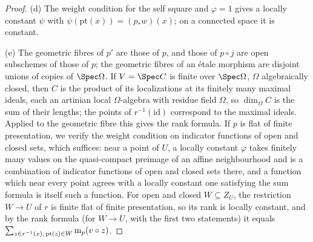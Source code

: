 \begin{proof}
(d) The weight condition for the self square and $\varphi=1$ gives a locally constant $\psi$ with
$\psi(\mathrm{pt}(x))=(p_\ast w)(x)$; on a connected space it is constant.

(e) The geometric fibres of $p'$ are those of $p$, and those of $p\circ j$ are open subschemes of those
of $p$; the geometric fibres of an \'etale morphism are disjoint unions of copies of $\Spec\Omega$. If
$V=\Spec C$ is finite over $\Spec\Omega$, $\Omega$ algebraically closed, then $C$ is the product of its
localizations at its finitely many maximal ideals, each an artinian local $\Omega$-algebra with residue
field $\Omega$, so $\dim_\Omega C$ is the sum of their lengths; the points of $r^{-1}(\mathrm{id})$
correspond to the maximal ideals. Applied to the geometric fibre this gives the rank formula. If $p$ is
flat of finite presentation, we verify the weight condition on indicator functions of open and closed
sets, which suffices: near a point of $U$, a locally constant $\varphi$ takes finitely many values on
the quasi-compact preimage of an affine neighbourhood and is a combination of indicator functions of
open and closed sets there, and a function which near every point agrees with a locally constant one
satisfying the sum formula is itself such a function. For open and closed $W\subseteq Z_U$, the
restriction $W\to U$ of $r$ is finite flat of finite presentation, so its rank is locally constant,
and by the rank formula (for $W\to U$, with the first two statements) it equals
$\sum_{z\in r^{-1}(x),\,\mathrm{pt}(z)\in W}\mathrm{m}_p(v\circ z)$.


\end{proof}
